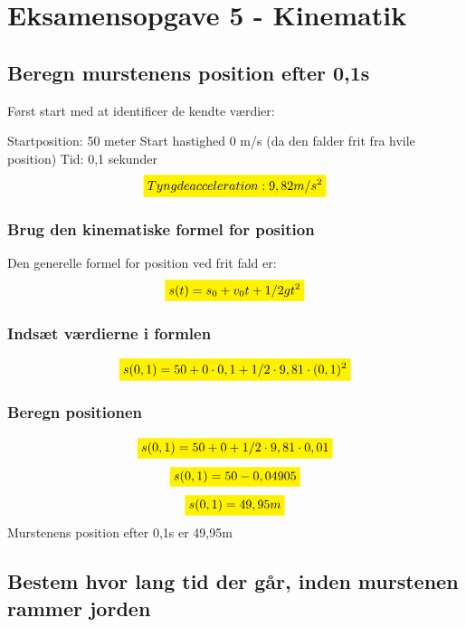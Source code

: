\section{Eksamensopgave 5 - Kinematik}
\subsection{Beregn murstenens position efter 0,1s}
Først start med at identificer de kendte værdier:

Startposition: 50 meter
Start hastighed 0 m/s (da den falder frit fra hvile position)
Tid: 0,1 sekunder
\begin{equation*}
    \mathcolorbox{yellow}{Tyngdeacceleration: 9,82m/s^{2}}
\end{equation*}


\subsubsection{Brug den kinematiske formel for position}
Den generelle formel for position ved frit fald er:
\begin{equation*}
    \mathcolorbox{yellow}{s(t)=s_0+v_0t+1/2gt^{2}}
\end{equation*}

\subsubsection{Indsæt værdierne i formlen}
\begin{equation*}
    \mathcolorbox{yellow}{s(0,1)=50+0\cdot0,1+1/2\cdot9,81\cdot(0,1)^{2}}
\end{equation*}

\subsubsection{Beregn positionen}
\begin{equation*}
    \mathcolorbox{yellow}{s(0,1)=50+0+1/2\cdot9,81\cdot0,01}
\end{equation*}
\begin{equation*}
    \mathcolorbox{yellow}{s(0,1)=50-0,04905}
\end{equation*}
\begin{equation*}
    \mathcolorbox{yellow}{s(0,1)=49,95m}
\end{equation*}
Murstenens position efter 0,1s er 49,95m

\subsection{Bestem hvor lang tid der går, inden murstenen rammer jorden}

